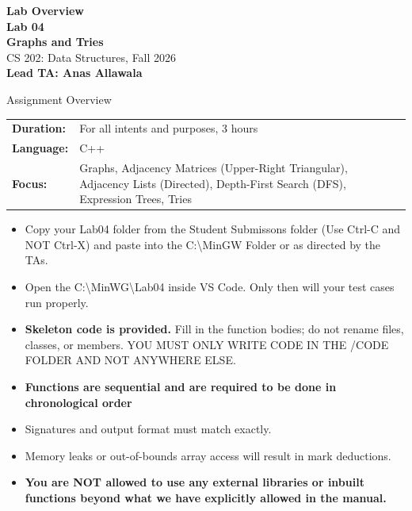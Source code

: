 \documentclass[11pt]{article}
\begin{document}
\begin{center}
    {\Huge \textbf{Lab Overview}}\\[10pt]
    {\LARGE \textbf{Lab 04}}\\[8pt]
    {\Large \textbf{Graphs and Tries}}\\[8pt]
    {\large CS 202: Data Structures, Fall 2026}\\[15pt]
    {\large \textbf{Lead TA: Anas Allawala}}
\end{center}

\vspace{1.5em}

\begin{infobox}{Assignment Overview}
\begin{tabular}{@{}lp{}@{}}
    \textbf{Duration:}  & For all intents and purposes, 3 hours \\
    \textbf{Language:}  & C++ \\
    \textbf{Focus:}     & Graphs, Adjacency Matrices (Upper-Right Triangular), Adjacency Lists (Directed), Depth-First Search (DFS), Expression Trees, Tries
\end{tabular}
\end{infobox}

\vspace{1em}

\begin{tcolorbox}[
    colback=red!5!white,
    colframe=red!80!black,
    title=\textbf{Read Before Starting},
    fonttitle=\bfseries\large,
    arc=2mm,
    boxrule=1.2pt,
    left=6pt, right=6pt, top=6pt, bottom=6pt,
    drop shadow=gray!30
]
\begin{itemize}[leftmargin=1.5em, itemsep=4pt, parsep=0pt, topsep=2pt]
    \item Copy your Lab04 folder from the Student Submissons folder (Use Ctrl-C and NOT Ctrl-X) and paste into the C:\textbackslash MinGW Folder or as directed by the TAs. 
    \item Open the C:\textbackslash MinWG\textbackslash Lab04 inside VS Code. Only then will your test cases run properly.
    \item \textbf{Skeleton code is provided.} Fill in the function bodies; do not rename files, classes, or members. YOU MUST ONLY WRITE CODE IN THE /CODE FOLDER AND NOT ANYWHERE ELSE.
    \item \textbf{Functions are sequential and are required to be done in chronological order}
    \item Signatures and output format must match exactly.
    \item Memory leaks or out-of-bounds array access will result in mark deductions.
    \item \textbf{You are NOT allowed to use any external libraries or inbuilt functions beyond what we have explicitly allowed in the manual.}
\end{itemize}
\end{tcolorbox}
\end{document}
